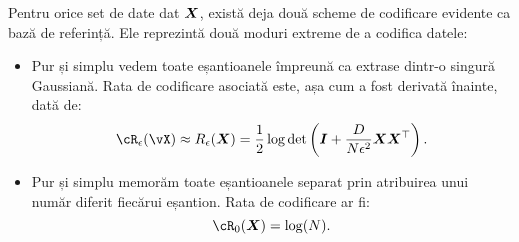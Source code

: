 \documentclass[../../book-main_ro.tex]{subfiles}
\begin{document}
Pentru orice set de date dat $\bm{X}$, există deja două scheme de codificare evidente ca bază de referință. Ele reprezintă două moduri extreme de a codifica datele:
\begin{itemize}
	\item Pur și simplu vedem toate eșantioanele împreună ca extrase dintr-o singură Gaussiană. Rata de codificare asociată este, așa cum a fost derivată înainte, dată de:
	      \begin{equation}
		      \cR_{\epsilon}(\vX) \approx R_{\epsilon}(\X) = \frac{1}{2} \log \det \left(\boldsymbol{I} + \frac{D}{N\epsilon^2} \X\X^\top \right).
	      \end{equation}
	\item Pur și simplu memorăm toate eșantioanele separat prin atribuirea unui număr diferit fiecărui eșantion. Rata de codificare ar fi:
	      \begin{equation}
		      \cR_0(\X) = \log(N).
	      \end{equation}
\end{itemize}
\end{document}
